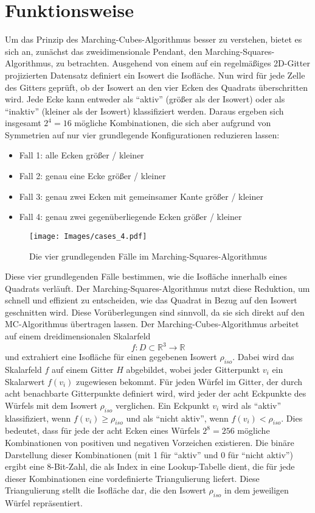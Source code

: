 \documentclass[12pt]{article}
\begin{document}
\section{Funktionsweise}
Um das Prinzip des Marching-Cubes-Algorithmus besser zu verstehen, bietet es sich an, zunächst das zweidimensionale Pendant, den Marching-Squares-Algorithmus, zu betrachten.
Ausgehend von einem auf ein regelmäßiges 2D-Gitter projizierten Datensatz definiert ein Isowert die Isofläche.
Nun wird für jede Zelle des Gitters geprüft, ob der Isowert an den vier Ecken des Quadrats überschritten wird.
Jede Ecke kann entweder als ``aktiv'' (größer als der Isowert) oder als ``inaktiv'' (kleiner als der Isowert) klassifiziert werden.
Daraus ergeben sich insgesamt $2^4 = 16$ mögliche Kombinationen, die sich aber aufgrund von Symmetrien auf nur vier grundlegende Konfigurationen reduzieren lassen:\\
\begin{itemize}
\item{Fall 1: alle Ecken größer / kleiner}
\item{Fall 2: genau eine Ecke größer / kleiner}
\item{Fall 3: genau zwei Ecken mit gemeinsamer Kante größer / kleiner}
\item{Fall 4: genau zwei gegenüberliegende Ecken größer / kleiner}
\end{itemize}
\begin{figure}[H]
\centering
\texttt{[image: Images/cases\_4.pdf]}
\caption{Die vier grundlegenden Fälle im Marching-Squares-Algorithmus}
\end{figure}
Diese vier grundlegenden Fälle bestimmen, wie die Isofläche innerhalb eines Quadrats verläuft.
Der Marching-Squares-Algorithmus nutzt diese Reduktion, um schnell und effizient zu entscheiden, wie das Quadrat in Bezug auf den Isowert geschnitten wird.
Diese Vorüberlegungen sind sinnvoll, da sie sich direkt auf den MC-Algorithmus übertragen lassen.
Der Marching-Cubes-Algorithmus arbeitet auf einem dreidimensionalen Skalarfeld $$f: D \subset \mathbb{R}^3 \rightarrow \mathbb{R}$$ und extrahiert eine Isofläche für einen gegebenen Isowert $\rho_{iso}$.
Dabei wird das Skalarfeld $f$ auf einem Gitter $H$ abgebildet, wobei jeder Gitterpunkt $v_i$ ein Skalarwert $f(v_i)$ zugewiesen bekommt.
Für jeden Würfel im Gitter, der durch acht benachbarte Gitterpunkte definiert wird, wird jeder der acht Eckpunkte des Würfels mit dem Isowert $\rho_{iso}$ verglichen.
Ein Eckpunkt $v_i$ wird als ``aktiv'' klassifiziert, wenn $f(v_i) \ge \rho_{iso}$ und als ``nicht aktiv'', wenn $f(v_i) < \rho_{iso}$.
Dies bedeutet, dass für jede der acht Ecken eines Würfels $2^8 = 256$ mögliche Kombinationen von positiven und negativen Vorzeichen existieren. 
Die binäre Darstellung dieser Kombinationen (mit 1 für ``aktiv'' und 0 für ``nicht aktiv'') ergibt eine 8-Bit-Zahl, die als Index in eine Lookup-Tabelle dient,
die für jede dieser Kombinationen eine vordefinierte Triangulierung liefert. Diese Triangulierung stellt die Isofläche dar, die den Isowert $\rho_{iso}$ in dem jeweiligen Würfel repräsentiert.
\newpage
\end{document}
